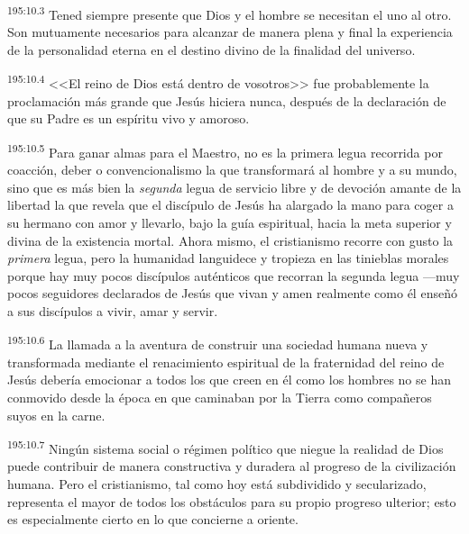 \par 
\textsuperscript{195:10.3} Tened siempre presente que Dios y el hombre se necesitan el uno al otro. Son mutuamente necesarios para alcanzar de manera plena y final la experiencia de la personalidad eterna en el destino divino de la finalidad del universo.

\par 
\textsuperscript{195:10.4} <<El reino de Dios está dentro de vosotros>> fue probablemente la proclamación más grande que Jesús hiciera nunca, después de la declaración de que su Padre es un espíritu vivo y amoroso.

\par 
\textsuperscript{195:10.5} Para ganar almas para el Maestro, no es la primera legua recorrida por coacción, deber o convencionalismo la que transformará al hombre y a su mundo, sino que es más bien la \textit{segunda} legua de servicio libre y de devoción amante de la libertad la que revela que el discípulo de Jesús ha alargado la mano para coger a su hermano con amor y llevarlo, bajo la guía espiritual, hacia la meta superior y divina de la existencia mortal. Ahora mismo, el cristianismo recorre con gusto la \textit{primera} legua, pero la humanidad languidece y tropieza en las tinieblas morales porque hay muy pocos discípulos auténticos que recorran la segunda legua ---muy pocos seguidores declarados de Jesús que vivan y amen realmente como él enseñó a sus discípulos a vivir, amar y servir.

\par 
\textsuperscript{195:10.6} La llamada a la aventura de construir una sociedad humana nueva y transformada mediante el renacimiento espiritual de la fraternidad del reino de Jesús debería emocionar a todos los que creen en él como los hombres no se han conmovido desde la época en que caminaban por la Tierra como compañeros suyos en la carne.

\par 
\textsuperscript{195:10.7} Ningún sistema social o régimen político que niegue la realidad de Dios puede contribuir de manera constructiva y duradera al progreso de la civilización humana. Pero el cristianismo, tal como hoy está subdividido y secularizado, representa el mayor de todos los obstáculos para su propio progreso ulterior; esto es especialmente cierto en lo que concierne a oriente.

